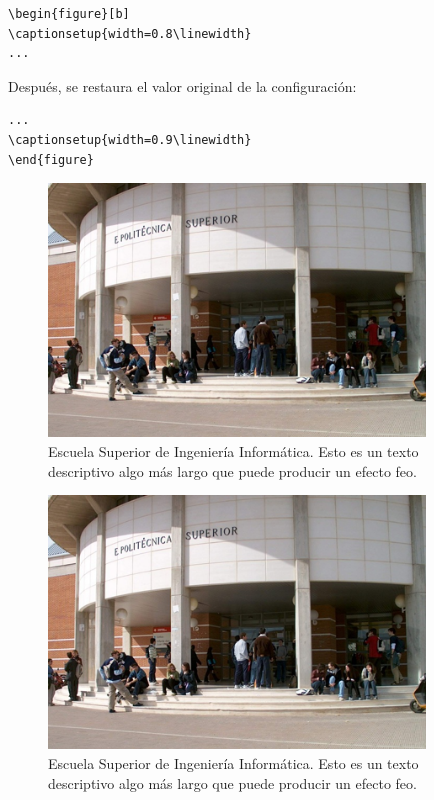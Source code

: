 \begin{verbatim}
\begin{figure}[b] 
\captionsetup{width=0.8\linewidth}
...
\end{verbatim}

Después, se restaura el valor original de la configuración:
\begin{verbatim}
...
\captionsetup{width=0.9\linewidth}
\end{figure}
\end{verbatim}


\begin{figure}[p] 
\captionsetup{width=1\linewidth}
\begin{center}
\includegraphics[width=10cm]{figs/esiiab.png}
\end{center}
\caption[Escuela Superior de Ingeniería Informática I]{Escuela Superior de Ingeniería Informática. Esto es un texto descriptivo algo más largo que puede producir un efecto feo.}
\label{fig:esiiabI}
\end{figure}



\begin{figure}[p] 
\captionsetup{width=0.8\linewidth}
\begin{center}
\includegraphics[width=10cm]{figs/esiiab.png}
\end{center}
\caption[Escuela Superior de Ingeniería Informática II]{Escuela Superior de Ingeniería Informática. Esto es un texto descriptivo algo más largo que puede producir un efecto feo.}
\label{fig:esiiabII}
\captionsetup{width=0.9\linewidth}
\end{figure}

